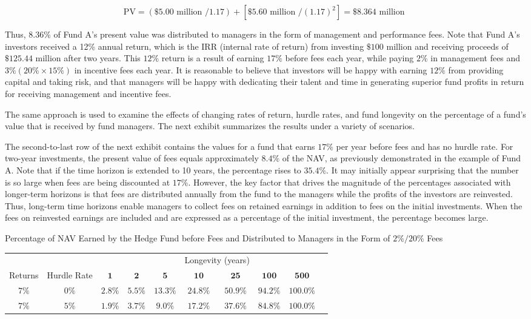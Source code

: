 \documentclass[11pt]{article}
\begin{document}
$$
\mathrm{PV}=(\$ 5.00 \text { million } / 1.17)+\left[\$ 5.60 \text { million } /(1.17)^{2}\right]=\$ 8.364 \text { million }
$$

Thus, 8.36\% of Fund A's present value was distributed to managers in the form of management and performance fees. Note that Fund A's investors received a 12\% annual return, which is the IRR (internal rate of return) from investing $\$ 100$ million and receiving proceeds of $\$ 125.44$ million after two years. This $12 \%$ return is a result of earning $17 \%$ before fees each year, while paying $2 \%$ in management fees and $3 \%(20 \% \times 15 \%)$ in incentive fees each year. It is reasonable to believe that investors will be happy with earning $12 \%$ from providing capital and taking risk, and that managers will be happy with dedicating their talent and time in generating superior fund profits in return for receiving management and incentive fees.

The same approach is used to examine the effects of changing rates of return, hurdle rates, and fund longevity on the percentage of a fund's value that is received by fund managers. The next exhibit summarizes the results under a variety of scenarios.

The second-to-last row of the next exhibit contains the values for a fund that earns $17 \%$ per year before fees and has no hurdle rate. For two-year investments, the present value of fees equals approximately $8.4 \%$ of the NAV, as previously demonstrated in the example of Fund A. Note that if the time horizon is extended to 10 years, the percentage rises to $35.4 \%$. It may initially appear surprising that the number is so large when fees are being discounted at $17 \%$. However, the key factor that drives the magnitude of the percentages associated with longer-term horizons is that fees are distributed annually from the fund to the managers while the profits of the investors are reinvested. Thus, long-term time horizons enable managers to collect fees on retained earnings in addition to fees on the initial investments. When the fees on reinvested earnings are included and are expressed as a percentage of the initial investment, the percentage becomes large.

Percentage of NAV Earned by the Hedge Fund before Fees and Distributed to Managers in the Form of $2 \% / 20 \%$ Fees

\begin{center}
\begin{tabular}{|cccccccccc|}
\hline
 &  &  &  &  & \multicolumn{2}{c|}{Longevity (years)} &  &  \\
Returns & Hurdle Rate & $\mathbf{1}$ & $\mathbf{2}$ & $\mathbf{5}$ & $\mathbf{1 0}$ & $\mathbf{2 5}$ & $\mathbf{1 0 0}$ & $\mathbf{5 0 0}$ \\
\hline
$7 \%$ & $0 \%$ & $2.8 \%$ & $5.5 \%$ & $13.3 \%$ & $24.8 \%$ & $50.9 \%$ & $94.2 \%$ & $100.0 \%$ \\
$7 \%$ & $5 \%$ & $1.9 \%$ & $3.7 \%$ & $9.0 \%$ & $17.2 \%$ & $37.6 \%$ & $84.8 \%$ & $100.0 \%$ \\
\hline
\end{tabular}
\end{center}
\end{document}
